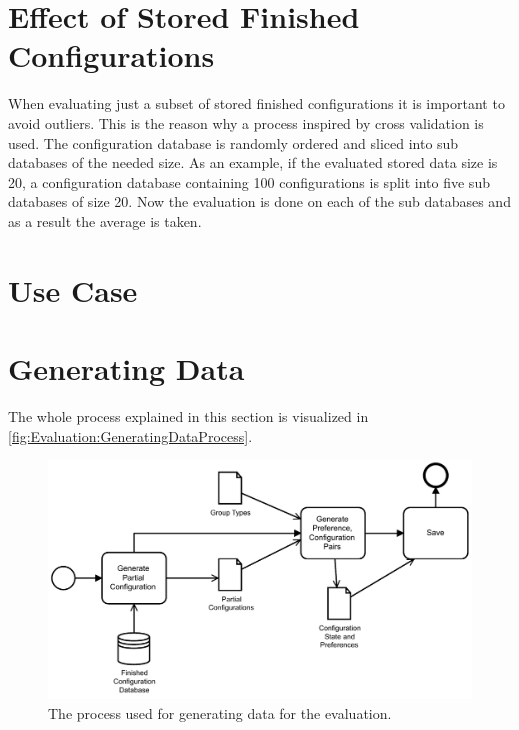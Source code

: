 \section{Effect of Stored Finished Configurations}
\label{sec:Evaluation:EffectFinishedConfiguration}

When evaluating just a subset of stored finished configurations it is important to avoid outliers. This is the reason why a process inspired by cross validation is used. The configuration database is randomly ordered and sliced into sub databases of the needed size. As an example, if the evaluated stored data size is 20, a configuration database containing 100 configurations is split into five sub databases of size 20. Now the evaluation is done on each of the sub databases and as a result the average is taken.

\section{Use Case}
\label{sec:Evaluation:UseCase}


\section{Generating Data}
\label{sec:Evaluation:GeneratingGroups}

The whole process explained in this section is visualized in \autoref{fig:Evaluation:GeneratingDataProcess}.

\begin{figure}
    \centering
    \includegraphics[width=1\textwidth]{./figures/60_evaluation/bpmn_evaluation_input_data_generation.pdf}
    \caption{The process used for generating data for the evaluation.}
    \label{fig:Evaluation:GeneratingDataProcess}
\end{figure}

